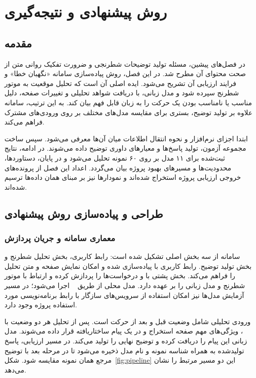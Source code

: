 \chapter{روش پیشنهادی و نتیجه‌گیری}
\label{ch:method}
\section{مقدمه}
در فصل‌های پیشین، مسئله تولید توضیحات شطرنجی و ضرورت تفکیک روانی متن از صحت محتوای آن مطرح شد. در این فصل، روش پیاده‌سازی سامانه «نگهبان خطا» و فرایند ارزیابی آن تشریح می‌شود. ایده اصلی آن است که تحلیل موقعیت به موتور شطرنج سپرده شود و مدل زبانی، با دریافت شواهد تحلیلی و تغییرات صفحه، دلیل مناسب یا نامناسب بودن یک حرکت را به زبان قابل فهم بیان کند. به این ترتیب، سامانه علاوه بر تولید توضیح، بستری برای مقایسه مدل‌های مختلف بر روی ورودی‌های مشترک فراهم می‌کند.

ابتدا اجزای نرم‌افزار و نحوه انتقال اطلاعات میان آن‌ها معرفی می‌شود. سپس ساخت مجموعه آزمون، تولید پاسخ‌ها و معیارهای داوری توضیح داده می‌شوند. در ادامه، نتایج ثبت‌شده برای ۱۱ مدل بر روی ۶۰ نمونه تحلیل می‌شود و در پایان، دستاوردها، محدودیت‌ها و مسیرهای بهبود پروژه بیان می‌گردد. اعداد این فصل از پرونده‌های خروجی ارزیابی پروژه استخراج شده‌اند و نمودارها نیز بر مبنای همان داده‌ها ترسیم شده‌اند.

\section{طراحی و پیاده‌سازی روش پیشنهادی}
\subsection{معماری سامانه و جریان پردازش}
سامانه از سه بخش اصلی تشکیل شده است: رابط کاربری، بخش تحلیل شطرنج و بخش تولید توضیح. رابط کاربری با  پیاده‌سازی شده و امکان نمایش صفحه و متن تحلیل را فراهم می‌کند. بخش پشتی با  و  درخواست‌ها را پردازش کرده و ارتباط با موتور شطرنج و مدل زبانی را بر عهده دارد. مدل محلی از طریق ~\cite{llamacpp-doc} اجرا می‌شود؛ در مسیر آزمایش مدل‌ها نیز امکان استفاده از سرویس‌های سازگار با رابط برنامه‌نویسی مورد استفاده پروژه وجود دارد.

ورودی تحلیلی شامل وضعیت قبل و بعد از حرکت است. پس از تحلیل هر دو وضعیت با ~\cite{stockfish-doc}، ویژگی‌های مهم صفحه استخراج و در یک پیام ساختاریافته قرار داده می‌شوند. مدل زبانی این پیام را دریافت کرده و توضیح نهایی را تولید می‌کند. در مسیر ارزیابی، پاسخ تولیدشده به همراه شناسه نمونه و نام مدل ذخیره می‌شود تا در مرحله بعد با توضیح مرجع همان نمونه مقایسه شود. شکل~\ref{fig:pipeline} این دو مسیر مرتبط را نشان می‌دهد.

